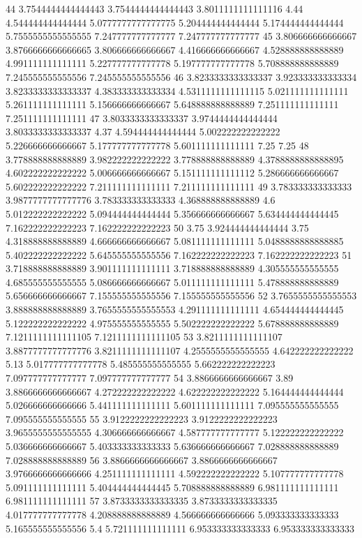 44 3.7544444444444443 3.7544444444444443 3.8011111111111116 4.44 4.544444444444444 5.0777777777777775 5.204444444444444 5.174444444444444 5.7555555555555555 7.247777777777777 7.247777777777777
45 3.806666666666667 3.8766666666666665 3.806666666666667 4.416666666666667 4.528888888888889 4.991111111111111 5.227777777777778 5.197777777777778 5.708888888888889 7.245555555555556 7.245555555555556
46 3.8233333333333337 3.923333333333334 3.8233333333333337 4.383333333333334 4.5311111111111115 5.021111111111111 5.261111111111111 5.156666666666667 5.648888888888889 7.251111111111111 7.251111111111111
47 3.8033333333333337 3.9744444444444444 3.8033333333333337 4.37 4.594444444444444 5.002222222222222 5.226666666666667 5.177777777777778 5.601111111111111 7.25 7.25
48 3.778888888888889 3.982222222222222 3.778888888888889 4.3788888888888895 4.602222222222222 5.006666666666667 5.151111111111112 5.286666666666667 5.602222222222222 7.211111111111111 7.211111111111111
49 3.783333333333333 3.9877777777777776 3.783333333333333 4.368888888888889 4.6 5.012222222222222 5.094444444444444 5.356666666666667 5.634444444444445 7.162222222222223 7.162222222222223
50 3.75 3.924444444444444 3.75 4.318888888888889 4.666666666666667 5.081111111111111 5.0488888888888885 5.402222222222222 5.645555555555556 7.162222222222223 7.162222222222223
51 3.718888888888889 3.901111111111111 3.718888888888889 4.305555555555555 4.685555555555555 5.086666666666667 5.011111111111111 5.478888888888889 5.656666666666667 7.155555555555556 7.155555555555556
52 3.7655555555555553 3.888888888888889 3.7655555555555553 4.291111111111111 4.654444444444445 5.122222222222222 4.975555555555555 5.502222222222222 5.678888888888889 7.1211111111111105 7.1211111111111105
53 3.8211111111111107 3.8877777777777776 3.8211111111111107 4.2555555555555555 4.642222222222222 5.13 5.017777777777778 5.485555555555555 5.662222222222223 7.097777777777777 7.097777777777777
54 3.8866666666666667 3.89 3.8866666666666667 4.272222222222222 4.622222222222222 5.164444444444444 5.026666666666666 5.441111111111111 5.601111111111111 7.095555555555555 7.095555555555555
55 3.9122222222222223 3.9122222222222223 3.9655555555555555 4.306666666666667 4.587777777777777 5.122222222222222 5.036666666666667 5.403333333333333 5.636666666666667 7.028888888888889 7.028888888888889
56 3.8866666666666667 3.8866666666666667 3.9766666666666666 4.251111111111111 4.592222222222222 5.107777777777778 5.091111111111111 5.404444444444445 5.708888888888889 6.981111111111111 6.981111111111111
57 3.8733333333333335 3.8733333333333335 4.017777777777778 4.208888888888889 4.566666666666666 5.093333333333333 5.165555555555556 5.4 5.721111111111111 6.953333333333333 6.953333333333333
